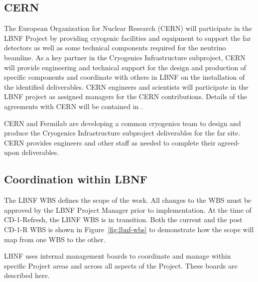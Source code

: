 \subsection{CERN}

The European Organization for Nuclear Research (CERN) will participate in the LBNF Project by providing cryogenic facilities and equipment to support the far detectors as well as some technical components required for the neutrino beamline. As a key partner in the Cryogenics Infrastructure subproject, CERN will provide engineering and technical support for the design and production of specific components and coordinate with others in LBNF on the installation of the identified deliverables. CERN engineers and scientists will participate in the LBNF project as assigned managers for the CERN contributions.
Details of the agreements with CERN will be contained in .  

CERN and Fermilab are developing a common cryogenics team to design and produce the Cryogenics Infrastructure subproject deliverables for the far site. CERN provides engineers and other staff as needed to complete their agreed-upon deliverables.  


\subsection{Coordination within LBNF}


The LBNF WBS defines the scope of the work. All changes to the WBS must be approved by the LBNF Project Manager prior to implementation. At the time of CD-1-Refresh, the LBNF WBS is in transition. Both the current and the post CD-1-R WBS is shown in Figure~\ref{fig:lbnf-wbs} to demonstrate how the scope will map from one WBS to the other. 

LBNF uses internal management boards to coordinate and manage within specific Project areas and across all aspects of the Project.  These boards are described here.


